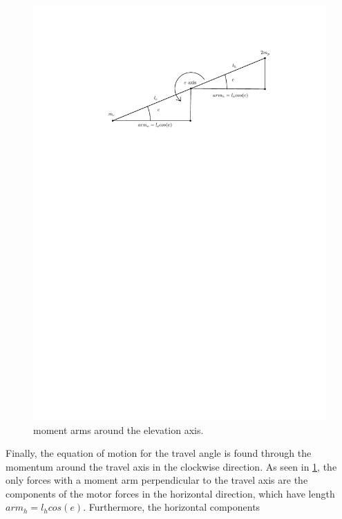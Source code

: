 \begin{figure}[H]
  \caption{moment arms around the elevation axis.}
  \label{fig:elevation_model}
  \includegraphics[width=1\textwidth]{images/elevation_model}
\end{figure}

Finally, the equation of motion for the travel angle is found through
the momentum around the travel axis in the  clockwise direction. As
seen in \cref{fig:elevation_model}, the only forces with a moment arm
perpendicular to the travel axis are the components of the motor
forces in the horizontal direction, which have length $arm_h =
l_hcos(e)$. Furthermore, the horizontal components



